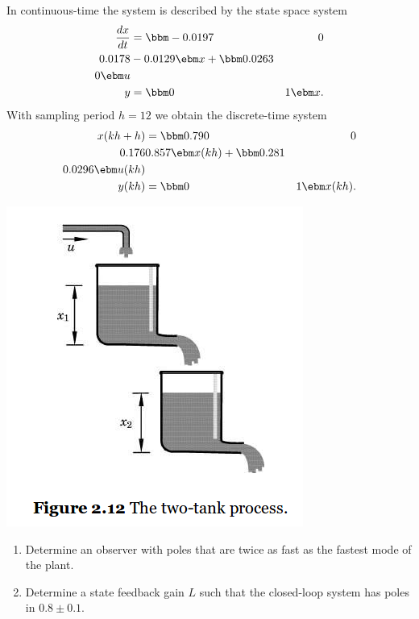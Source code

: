 \documentclass[letterpaper]{scrartcl}
\begin{document}
\begin{minipage}{0.6\linewidth}
In continuous-time the system is described by the state space system
\begin{align*}
\frac{dx}{dt} &= \bbm -0.0197 & 0\\0.0178 & -0.0129 \ebm x + \bbm 0.0263\\0 \ebm u\\
y &= \bbm 0 & 1 \ebm x.
\end{align*}
With sampling period \(h=12\) we obtain the discrete-time system
\begin{align*}
x(kh+h) &= \bbm 0.790 & 0\\ 0.176 & 0.857 \ebm x(kh) + \bbm 0.281\\ 0.0296 \ebm u(kh)\\
y(kh) &= \bbm 0 & 1 \ebm x(kh).
\end{align*}
\end{minipage}
\begin{minipage}{0.4\linewidth}
 \includegraphics[width=\linewidth]{../figures/fig2-12-two-tank-system.png}
\end{minipage}


\begin{enumerate}
\item Determine an observer with poles that are twice as fast as the fastest mode of the plant.
\item Determine a state feedback gain \(L\) such that the closed-loop system has poles in \( 0.8 \pm 0.1\).
\end{enumerate}
\end{document}
